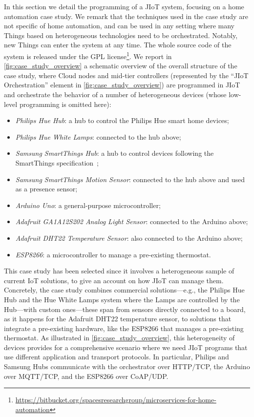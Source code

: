 In this section we detail the programming of a JIoT system, focusing on a home
automation case study. We remark that the techniques used in the case study are
not specific of home automation, and can be used in any setting where many
Things based on heterogeneous technologies need to be orchestrated. Notably, new
Things can enter the system at any time. The whole source code of the system is
released under the GPL
license\footnote{\url{https://bitbucket.org/spacesresearchgroup/microservices-for-home-automation}}.
We report in \cref{fig:case_study_overview} a schematic overview of the overall
structure of the case study, where Cloud nodes and mid-tier controllers
(represented by the ``JIoT Orchestration'' element in
\cref{fig:case_study_overview}) are programmed in JIoT and orchestrate the
behavior of a number of heterogeneous devices (whose low-level programming is
omitted here): \begin{itemize} \item \emph{Philips Hue Hub}: a hub to control
the Philips Hue smart home devices; \item \emph{Philips Hue White Lamps}:
connected to the hub above; \item \emph{Samsung SmartThings Hub}: a hub to
control devices following  the SmartThings specification~\cite{60}; \item
\emph{Samsung SmartThings Motion Sensor}: connected to the hub above  and used
as a presence sensor; \item \emph{Arduino Uno}: a general-purpose
microcontroller; \item \emph{Adafruit GA1A12S202 Analog Light Sensor}: connected
to the  Arduino above; \item \emph{Adafruit DHT22 Temperature Sensor}: also
connected to the  Arduino above; \item \emph{ESP8266}: a microcontroller to
manage a pre-existing  thermostat. \end{itemize} This case study has been
selected since it involves a heterogeneous sample of current IoT solutions, to
give an account on how JIoT can manage them.  Concretely, the case study
combines commercial solutions---e.g., the Philips Hue Hub and the Hue White
Lamps system where the Lamps are controlled by the Hub---with custom
ones---these span from sensors directly connected to a board, as it happens for
the Adafruit DHT22 temperature sensor, to solutions that integrate a
pre-existing hardware, like the ESP8266 that manages a pre-existing thermostat.
As illustrated in \cref{fig:case_study_overview}, this heterogeneity of devices
provides for a comprehensive scenario where we need JIoT programs that use
different application and transport protocols. In particular, Philips and
Samsung Hubs communicate with the orchestrator over HTTP/TCP, the Arduino over
MQTT/TCP, and the ESP8266 over CoAP/UDP.

